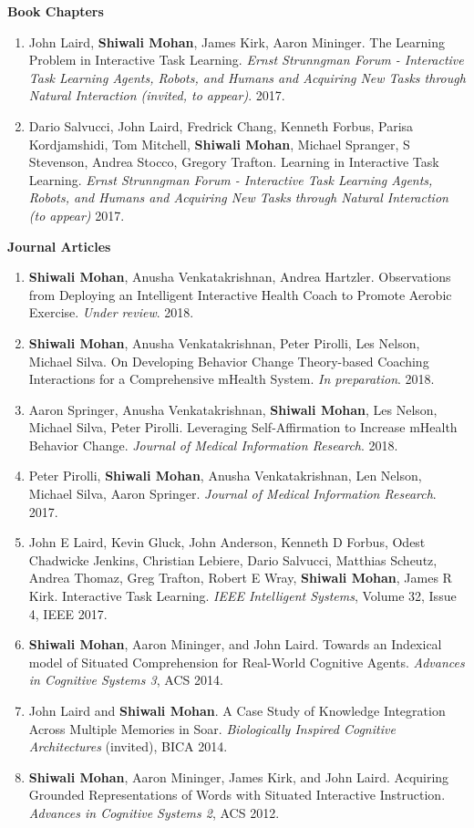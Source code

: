 \documentclass[margin,line,11pt]{res}
\begin{document}
\begin{resume}
\textbf{Book Chapters}
\begin{enumerate}[label=\lbrack B\arabic*\rbrack, leftmargin=*]
\item John Laird, \textbf{Shiwali Mohan}, James Kirk, Aaron Mininger. The Learning Problem in Interactive Task Learning. \emph{Ernst Strunngman Forum - Interactive Task Learning  Agents, Robots, and Humans and Acquiring New Tasks through Natural Interaction (invited, to appear)}. 2017.
  \item Dario Salvucci, John Laird, Fredrick Chang, Kenneth Forbus, Parisa Kordjamshidi, Tom Mitchell, \textbf{Shiwali Mohan}, Michael Spranger, S Stevenson, Andrea Stocco, Gregory Trafton. Learning in Interactive Task Learning. \emph{Ernst Strunngman Forum - Interactive Task Learning  Agents, Robots, and Humans and Acquiring New Tasks through Natural Interaction (to appear)} 2017. 
  \end{enumerate}

\textbf{Journal Articles}
\begin{enumerate}[label=\lbrack J\arabic*\rbrack, leftmargin=*]
\item \textbf{Shiwali Mohan}, Anusha Venkatakrishnan, Andrea Hartzler. Observations from Deploying an Intelligent Interactive Health Coach to Promote Aerobic Exercise. \emph{Under review}. 2018.
    \item \textbf{Shiwali Mohan}, Anusha Venkatakrishnan, Peter Pirolli, Les Nelson, Michael Silva. On Developing Behavior Change Theory-based Coaching Interactions for a Comprehensive mHealth System. \emph{In preparation}. 2018.
\item Aaron Springer, Anusha Venkatakrishnan, \textbf{Shiwali Mohan}, Les Nelson, Michael Silva, Peter Pirolli. Leveraging Self-Affirmation to Increase mHealth Behavior Change. \emph{Journal of Medical Information Research}. 2018.
\item Peter Pirolli, \textbf{Shiwali Mohan}, Anusha Venkatakrishnan, Len Nelson, Michael Silva, Aaron Springer. \emph{Journal of Medical Information Research}. 2017.
\item John E Laird, Kevin Gluck, John Anderson, Kenneth D Forbus, Odest Chadwicke Jenkins, Christian Lebiere, Dario Salvucci, Matthias Scheutz, Andrea Thomaz, Greg Trafton, Robert E Wray, \textbf{Shiwali Mohan}, James R Kirk. Interactive Task Learning. \emph{IEEE Intelligent Systems}, Volume 32, Issue 4, IEEE 2017.
\item \textbf{Shiwali Mohan}, Aaron Mininger, and John Laird. Towards an Indexical model of Situated Comprehension for Real-World Cognitive Agents. \emph{Advances in Cognitive Systems 3}, ACS 2014.
\item John Laird and \textbf{Shiwali Mohan}. A Case Study of Knowledge Integration Across Multiple Memories in Soar. \emph{Biologically Inspired Cognitive Architectures} (invited), BICA 2014.
\item \textbf{Shiwali Mohan}, Aaron Mininger, James Kirk, and John Laird. Acquiring Grounded Representations of Words with Situated Interactive Instruction. \emph{Advances in Cognitive Systems 2}, ACS 2012.
\end{enumerate}



\end{resume}
\end{document}
